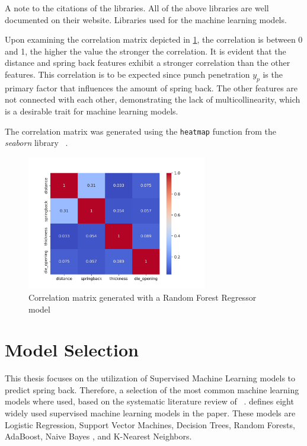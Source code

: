 {A note to the citations of the libraries.
All of the above libraries are well documented on their website.
Libraries used for the machine learning models.

Upon examining the correlation matrix depicted in \cref{fig:correlation_matrix}, the correlation is between 0 and 1,
the higher the value the stronger the correlation.
It is evident that the distance and spring back features exhibit a stronger correlation
than the other features.
This correlation is to be expected since punch penetration $y_p$ is the primary factor
that influences the amount of spring back.
The other features are not connected with each other, demonstrating the lack of multicollinearity, which is a
desirable trait for machine learning models.

The correlation matrix was generated using the \texttt{heatmap} function from the \textit{seaborn} library
~\cite{Waskom2021}.

\begin{figure}[H]
    \begin{tcolorbox}[arc=0pt,boxrule=0.5pt]
        \centering
        \includegraphics[width=0.7\textwidth]{chap4/images/correlation_matrix}
    \end{tcolorbox}
    \caption{Correlation matrix generated with a Random Forest Regressor model}
    \label{fig:correlation_matrix}
\end{figure}


\section{Model Selection}\label{sec:model-selection}
This thesis focuses on the utilization of Supervised Machine Learning models to predict
spring back.
Therefore, a selection of the most common machine learning models where used, based on
the systematic literature review of
~\cite{dridi2021supervised}.
\cite{dridi2021supervised} defines eight widely used supervised machine learning models in the paper.
These models are Logistic Regression, Support Vector Machines, Decision Trees, Random Forests, AdaBoost, Naive Bayes
, and K-Nearest Neighbors.

}
